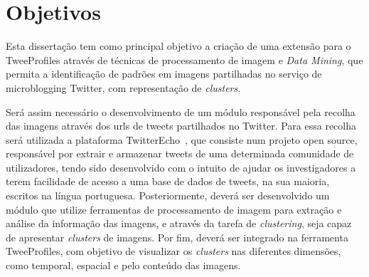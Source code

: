 
\section{Objetivos} \label{sec:object}

Esta dissertação tem como principal objetivo a criação de uma extensão para o TweeProfiles através de técnicas de processamento de imagem e \textit{Data Mining}, que permita a identificação de padrões em imagens partilhadas no serviço de microblogging Twitter, com representação de \textit{clusters}.


Será assim necessário o desenvolvimento de um módulo responsável pela recolha das imagens através dos urls de tweets partilhados no Twitter. Para essa recolha será utilizada a plataforma TwitterEcho~\citet{Boanjak2012}, que consiste num projeto open source, responsável por extrair e armazenar tweets de uma determinada comunidade de utilizadores, tendo sido desenvolvido com o intuito de ajudar os investigadores a terem facilidade de acesso a uma base de dados de tweets, na sua maioria, escritos na língua portuguesa.
Posteriormente, deverá ser desenvolvido um módulo que utilize ferramentas de processamento de imagem para extração e análise da informação das imagens, e através da tarefa de \textit{clustering}, seja capaz de apresentar \textit{clusters} de imagens.
Por fim, deverá ser integrado na ferramenta TweeProfiles, com objetivo de visualizar os \textit{clusters} nas diferentes dimensões, como temporal, espacial e pelo conteúdo das imagens.

